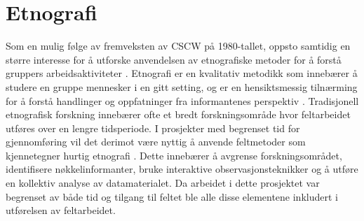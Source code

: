 \section{Etnografi}
\label{section:etnografi} 

Som en mulig følge av fremveksten av CSCW på 1980-tallet, oppsto samtidig en større interesse for å utforske anvendelsen av etnografiske metoder for å forstå gruppers arbeidsaktiviteter  \citep{Blomberg93}. Etnografi er en kvalitativ metodikk som innebærer å studere en gruppe mennesker i en gitt setting, og er en hensiktsmessig tilnærming for å forstå handlinger og oppfatninger fra informantenes perspektiv \citep{Blomberg93, Reeves08, Nardi97}. Tradisjonell etnografisk forskning innebærer ofte et bredt forskningsområde hvor feltarbeidet utføres over en lengre tidsperiode. I prosjekter med begrenset tid for gjennomføring vil det derimot være nyttig å anvende feltmetoder som kjennetegner hurtig etnografi \citep{Millen00}. Dette innebærer å avgrense forskningsområdet, identifisere nøkkelinformanter, bruke interaktive observasjonsteknikker og å utføre en kollektiv analyse av datamaterialet. Da arbeidet i dette prosjektet var begrenset av både tid og tilgang til feltet ble alle disse elementene inkludert i utførelsen av feltarbeidet.



